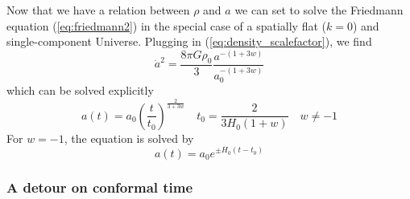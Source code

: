 \par Now that we have a relation between $\rho$ and $a$ we can set to solve the Friedmann equation (\ref{eq:friedmann2}) in the special case of a spatially flat ($k = 0$) and single-component Universe.
Plugging in (\ref{eq:density_scalefactor}), we find 
\begin{equation}
    \dot{a}^{2} = \frac{8\pi G \rho_{0}}{3}\frac{a^{-(1+3w)}}{a_{0}^{-(1+3w)}}
\end{equation}
which can be solved explicitly 
\begin{equation}
    \boxed{
        a(t) = a_{0}\left(\frac{t}{t_{0}}\right)^{\frac{2}{3+3w}} \quad t_{0} = \frac{2}{3H_{0}(1+w)} \quad w \neq -1
    }
    \label{eq:scalefactor_ev}
\end{equation}
For $w = -1$, the equation is solved by
\begin{equation}
    \boxed{
    a(t) = a_{0}e^{\pm H_{0}(t-t_{0})}
    }
    \label{eq:scalefactor_ev_cc}
\end{equation}

\subsubsection{A detour on conformal time}

